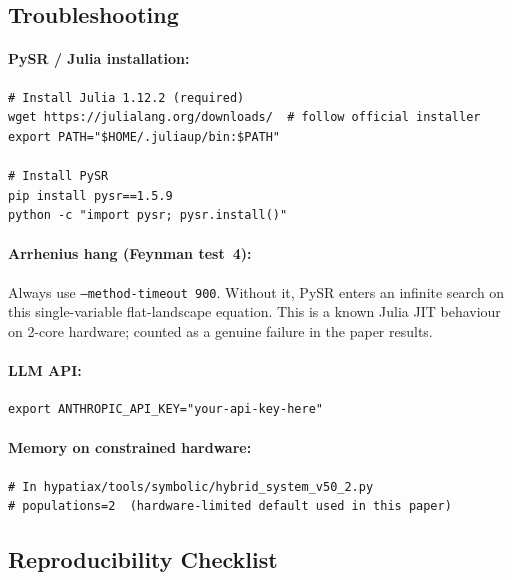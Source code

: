 \documentclass[twoside,11pt]{article}
\begin{document}
\subsection{Troubleshooting}

\paragraph{PySR / Julia installation:}
\begin{small}
\begin{verbatim}
# Install Julia 1.12.2 (required)
wget https://julialang.org/downloads/  # follow official installer
export PATH="$HOME/.juliaup/bin:$PATH"

# Install PySR
pip install pysr==1.5.9
python -c "import pysr; pysr.install()"
\end{verbatim}
\end{small}

\paragraph{Arrhenius hang (Feynman test~4):}
Always use \texttt{--method-timeout 900}. Without it, PySR enters an
infinite search on this single-variable flat-landscape equation.
This is a known Julia JIT behaviour on 2-core hardware; counted as a
genuine failure in the paper results.

\paragraph{LLM API:}
\begin{small}
\begin{verbatim}
export ANTHROPIC_API_KEY="your-api-key-here"
\end{verbatim}
\end{small}

\paragraph{Memory on constrained hardware:}
\begin{small}
\begin{verbatim}
# In hypatiax/tools/symbolic/hybrid_system_v50_2.py
# populations=2  (hardware-limited default used in this paper)
\end{verbatim}
\end{small}

\subsection{Reproducibility Checklist}
\end{document}
